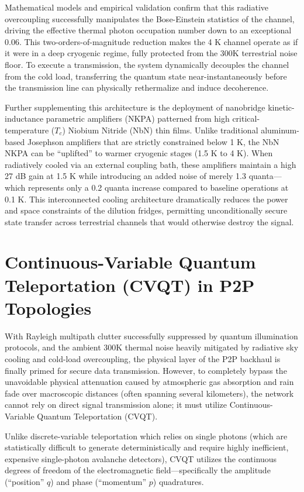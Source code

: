 \documentclass[11pt,a4paper]{article}
\begin{document}
Mathematical models and empirical validation confirm that this radiative overcoupling successfully manipulates the Bose-Einstein statistics of the channel, driving the effective thermal photon occupation number down to an exceptional 0.06.\cite{ref6} This two-orders-of-magnitude reduction makes the 4 K channel operate as if it were in a deep cryogenic regime, fully protected from the 300K terrestrial noise floor.\cite{ref44} To execute a transmission, the system dynamically decouples the channel from the cold load, transferring the quantum state near-instantaneously before the transmission line can physically rethermalize and induce decoherence.\cite{ref44}

Further supplementing this architecture is the deployment of nanobridge kinetic-inductance parametric amplifiers (NKPA) patterned from high critical-temperature ($T_c$) Niobium Nitride (NbN) thin films.\cite{ref43} Unlike traditional aluminum-based Josephson amplifiers that are strictly constrained below 1 K, the NbN NKPA can be ``uplifted'' to warmer cryogenic stages (1.5 K to 4 K).\cite{ref43} When radiatively cooled via an external coupling bath, these amplifiers maintain a high 27 dB gain at 1.5 K while introducing an added noise of merely 1.3 quanta---which represents only a 0.2 quanta increase compared to baseline operations at 0.1 K.\cite{ref43} This interconnected cooling architecture dramatically reduces the power and space constraints of the dilution fridges, permitting unconditionally secure state transfer across terrestrial channels that would otherwise destroy the signal.\cite{ref6}

\section{Continuous-Variable Quantum Teleportation (CVQT) in P2P Topologies}

With Rayleigh multipath clutter successfully suppressed by quantum illumination protocols, and the ambient 300K thermal noise heavily mitigated by radiative sky cooling and cold-load overcoupling, the physical layer of the P2P backhaul is finally primed for secure data transmission. However, to completely bypass the unavoidable physical attenuation caused by atmospheric gas absorption and rain fade over macroscopic distances (often spanning several kilometers), the network cannot rely on direct signal transmission alone; it must utilize Continuous-Variable Quantum Teleportation (CVQT).\cite{ref51}

Unlike discrete-variable teleportation which relies on single photons (which are statistically difficult to generate deterministically and require highly inefficient, expensive single-photon avalanche detectors), CVQT utilizes the continuous degrees of freedom of the electromagnetic field---specifically the amplitude (``position'' $q$) and phase (``momentum'' $p$) quadratures.\cite{ref52}
\end{document}
